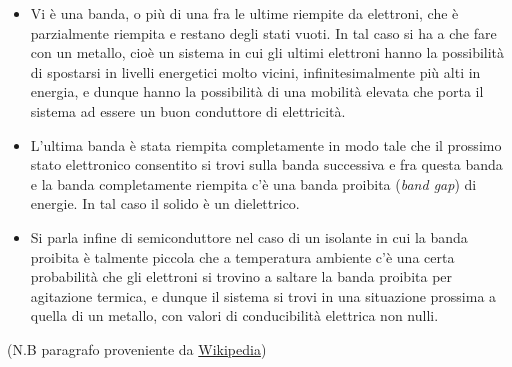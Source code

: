 \documentclass[
]{book}
\providecommand{\tightlist}{%
  \setlength{\itemsep}{0pt}\setlength{\parskip}{0pt}}
\begin{document}
\begin{itemize}
\tightlist
\item
  Vi è una banda, o più di una fra le ultime riempite da elettroni, che
  è parzialmente riempita e restano degli stati vuoti. In tal caso si ha
  a che fare con un metallo, cioè un sistema in cui gli ultimi elettroni
  hanno la possibilità di spostarsi in livelli energetici molto vicini,
  infinitesimalmente più alti in energia, e dunque hanno la possibilità
  di una mobilità elevata che porta il sistema ad essere un buon
  conduttore di elettricità.
\item
  L'ultima banda è stata riempita completamente in modo tale che il
  prossimo stato elettronico consentito si trovi sulla banda successiva
  e fra questa banda e la banda completamente riempita c'è una banda
  proibita (\emph{band gap}) di energie. In tal caso il solido è un
  dielettrico.
\item
  Si parla infine di semiconduttore nel caso di un isolante in cui la
  banda proibita è talmente piccola che a temperatura ambiente c'è una
  certa probabilità che gli elettroni si trovino a saltare la banda
  proibita per agitazione termica, e dunque il sistema si trovi in una
  situazione prossima a quella di un metallo, con valori di
  conducibilità elettrica non nulli.
\end{itemize}

(N.B paragrafo proveniente da
\href{https://it.wikipedia.org/wiki/Struttura_elettronica_a_bande}{Wikipedia})

\backmatter
\end{document}
